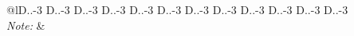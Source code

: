 \begin{table}[!htbp]
\begin{tabular}{@{\extracolsep{5pt}}lD{.}{.}{-3} D{.}{.}{-3} D{.}{.}{-3} D{.}{.}{-3} D{.}{.}{-3} D{.}{.}{-3} D{.}{.}{-3} D{.}{.}{-3} D{.}{.}{-3} D{.}{.}{-3} D{.}{.}{-3} D{.}{.}{-3} }
\hline 
\hline \\[-1.8ex] 
\textit{Note:}  &  \\ 
\end{tabular} 
\end{table} 
